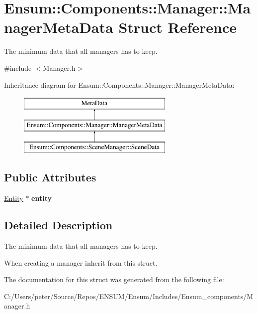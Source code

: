 \hypertarget{struct_ensum_1_1_components_1_1_manager_1_1_manager_meta_data}{}\section{Ensum\+:\+:Components\+:\+:Manager\+:\+:Manager\+Meta\+Data Struct Reference}
\label{struct_ensum_1_1_components_1_1_manager_1_1_manager_meta_data}


The minimum data that all managers has to keep.  




{\ttfamily \#include $<$Manager.\+h$>$}

Inheritance diagram for Ensum\+:\+:Components\+:\+:Manager\+:\+:Manager\+Meta\+Data\+:\begin{figure}[H]
\begin{center}
\leavevmode
\includegraphics[height=3.000000cm]{struct_ensum_1_1_components_1_1_manager_1_1_manager_meta_data}
\end{center}
\end{figure}
\subsection*{Public Attributes}
\begin{DoxyCompactItemize}
\item 
\hyperlink{struct_ensum_1_1_components_1_1_entity}{Entity} $\ast$ {\bfseries entity}\hypertarget{struct_ensum_1_1_components_1_1_manager_1_1_manager_meta_data_ac7f0ba43f4aa9d1586e2ebc0f6b52276}{}\label{struct_ensum_1_1_components_1_1_manager_1_1_manager_meta_data_ac7f0ba43f4aa9d1586e2ebc0f6b52276}

\end{DoxyCompactItemize}


\subsection{Detailed Description}
The minimum data that all managers has to keep. 

When creating a manager inherit from this struct. 

The documentation for this struct was generated from the following file\+:\begin{DoxyCompactItemize}
\item 
C\+:/\+Users/peter/\+Source/\+Repos/\+E\+N\+S\+U\+M/\+Ensum/\+Includes/\+Ensum\+\_\+components/Manager.\+h\end{DoxyCompactItemize}
